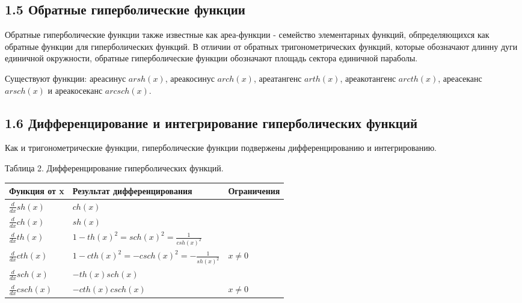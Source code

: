 \subsection*{1.5 Обратные гиперболические функции}

Обратные гиперболические функции также известные как ареа-функции - семейство элементарных функций, обпределяющихся как обратные функции для гиперболических функций. В отличии от обратных тригонометрических функций, которые обозначают длинну дуги единичной окружности, обратные гиперболические функции обозначают площадь сектора единичной параболы.

Существуют функции: ареасинус $arsh(x)$, ареакосинус $arch(x)$, ареатангенс $arth(x)$, ареакотангенс $arcth(x)$, ареасеканс $arsch(x)$ и ареакосеканс $arcsch(x)$.

\subsection*{1.6 Дифференцирование и интегрирование гиперболических функций}
Как и тригонометрические функции, гиперболические функции подвержены дифференцированию и интегрированию.

Таблица 2. Дифференцирование гиперболических функций.
\begin{center}
    \begin{tabular}{| p{3cm} | p{7cm} | p{3cm} |}
        \hline
        Функция от x & Результат дифференцирования & Ограничения\\ \hline
        $\frac{d}{dx}sh(x)$ & $ch(x)$ & \\ \hline
        $\frac{d}{dx}ch(x)$ & $sh(x)$ & \\ \hline
        $\frac{d}{dx}th(x)$ & $1-th(x)^2=sch(x)^2=\frac{1}{csh(x)^2}$ & \\ \hline
        $\frac{d}{dx}cth(x)$ & $1-cth(x)^2=-csch(x)^2=-\frac{1}{sh(x)^2}$ & $x\neq0$\\ \hline
        $\frac{d}{dx}sch(x)$ & $-th(x)sch(x)$ & \\ \hline
        $\frac{d}{dx}csch(x)$ & $-cth(x)csch(x)$ & $x\neq0$\\ \hline
    \end{tabular}
\end{center}

